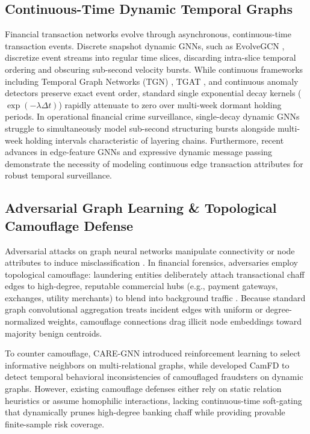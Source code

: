 \subsection{Continuous-Time Dynamic Temporal Graphs}
\label{sec:related_temporal_graphs}
Financial transaction networks evolve through asynchronous, continuous-time transaction events. Discrete snapshot dynamic GNNs, such as EvolveGCN \citep{pareja2020evolvegcn}, discretize event streams into regular time slices, discarding intra-slice temporal ordering and obscuring sub-second velocity bursts. While continuous frameworks including Temporal Graph Networks (TGN) \citep{rossi2020temporal}, TGAT \citep{xu2020inductive}, and continuous anomaly detectors \citep{wang2024temporal} preserve exact event order, standard single exponential decay kernels ($\exp(-\lambda \Delta t)$) rapidly attenuate to zero over multi-week dormant holding periods. In operational financial crime surveillance, single-decay dynamic GNNs struggle to simultaneously model sub-second structuring bursts alongside multi-week holding intervals characteristic of layering chains. Furthermore, recent advances in edge-feature GNNs and expressive dynamic message passing \citep{egressy2024provably} demonstrate the necessity of modeling continuous edge transaction attributes for robust temporal surveillance.

\subsection{Adversarial Graph Learning \& Topological Camouflage Defense}
\label{sec:related_adversarial}
Adversarial attacks on graph neural networks manipulate connectivity or node attributes to induce misclassification \citep{zugner2018adversarial}. In financial forensics, adversaries employ topological camouflage: laundering entities deliberately attach transactional chaff edges to high-degree, reputable commercial hubs (e.g., payment gateways, exchanges, utility merchants) to blend into background traffic \citep{dou2020enhancing}. Because standard graph convolutional aggregation treats incident edges with uniform or degree-normalized weights, camouflage connections drag illicit node embeddings toward majority benign centroids.

To counter camouflage, CARE-GNN \citep{dou2020enhancing} introduced reinforcement learning to select informative neighbors on multi-relational graphs, while \citet{ou2025camfd} developed CamFD to detect temporal behavioral inconsistencies of camouflaged fraudsters on dynamic graphs. However, existing camouflage defenses either rely on static relation heuristics or assume homophilic interactions, lacking continuous-time soft-gating that dynamically prunes high-degree banking chaff while providing provable finite-sample risk coverage.

